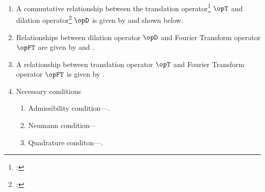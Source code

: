 \begin{enumerate}

\item A commutative relationship between the 
      translation operator\footnote{: } $\opT$ 
      and dilation operator\footnote{: } $\opD$ 
      is given by  and shown below.

\item Relationships between dilation operator $\opD$ and Fourier Transform operator $\opFT$
      are given by  and .

\item A relationship between translation operator $\opT$ and Fourier Transform operator $\opFT$
      is given by .

\item Necessary conditions 
\begin{enumerate}
  \item Admissibility condition---.

  \item Neumann condition---

  \item Quadrature conditon---.


\end{enumerate}
\end{enumerate}
